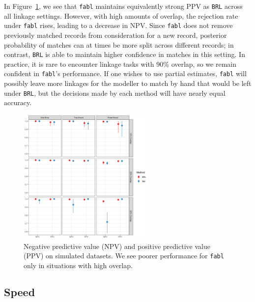 \documentclass[12pt,letterpaper]{article}
\newcommand{\1}[1]{\mathbb{I}\!\left[#1\right]} %
\begin{document}
In Figure~\ref{fig:sadinle_simulation_partial}, we see that \texttt{fabl} maintains equivalently strong PPV as \texttt{BRL} across all linkage settings. However, with high amounts of overlap, the rejection rate under \texttt{fabl} rises, leading to a decrease in NPV. Since \texttt{fabl} does not remove previously matched records from consideration for a new record, posterior probability of matches can at times be more split across different records; in contrast, \texttt{BRL} is able to maintain higher confidence in matches in this setting. In practice, it is rare to encounter linkage tasks with 90\% overlap, so we remain confident in \texttt{fabl}'s performance. If one wishes to use partial estimates, \texttt{fabl} will possibly leave more linkages for the modeller to match by hand that would be left under \texttt{BRL}, but the decisions made by each method will have nearly equal accuracy. 


\begin{figure}[h!]
\begin{center}
	\includegraphics[width=0.6\textwidth]{../notes/figures/sadinle_sim_plot_partial} 
	\caption{Negative predictive value (NPV) and positive predictive value (PPV) on simulated datasets. We see poorer performance for \texttt{fabl} only in situations with high overlap.}
	\label{fig:sadinle_simulation_partial}
\end{center}
\end{figure}

\hypertarget{speed}{%
	\subsection{Speed}\label{speed}}
\end{document}
